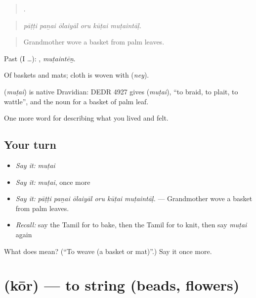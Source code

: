 \begin{quote}
     .
\end{quote}

\begin{quote}
\emph{pāṭṭi paṉai ōlaiyāl oru kūṭai muṭaintāḷ.}
\end{quote}

\begin{quote}
Grandmother wove a basket from palm leaves.
\end{quote}

Past (I …): , \emph{muṭaintēṉ}.

Of baskets and mats; cloth is woven with  (\emph{ney}).

\begin{cousinweb}
\textbf{} (\emph{muṭai}) is native Dravidian: DEDR 4927 gives  (\emph{muṭai}), \textquotedblleft{}to braid, to plait, to wattle\textquotedblright{}, and the noun for a basket of palm leaf.
\end{cousinweb}

\begin{grammarlens}[title={What you've built}]
One more word for describing what you lived and felt.
\end{grammarlens}

\subsection*{Your turn}
\begin{itemize}
\raggedright
  \item \emph{Say it:} \emph{muṭai}
  \item \emph{Say it:} \emph{muṭai}, once more
  \item \emph{Say it:} \emph{pāṭṭi paṉai ōlaiyāl oru kūṭai muṭaintāḷ.} — Grandmother wove a basket from palm leaves.
  \item \emph{Recall:} say the Tamil for to bake, then the Tamil for to knit, then say \emph{muṭai} again
\end{itemize}

\begin{tcolorbox}[breakable,colback=teal!4,colframe=teal!35!black,title={Before you move on}]
What does  mean? (\textquotedblleft{}To weave (a basket or mat)\textquotedblright{}.) Say it once more.
\end{tcolorbox}
\section[\texorpdfstring{\ta{கோர்} (kōr)}{கோர் (kōr)}]{ (kōr) — to string (beads, flowers)}


